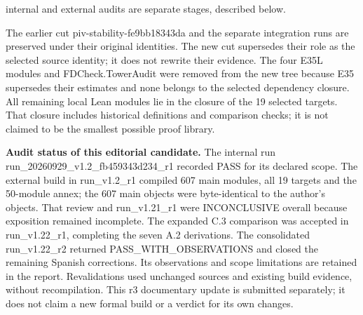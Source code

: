 \documentclass[english,11pt,a4paper]{article}
\newcounter{none}
\begin{document}
internal and external audits are separate stages, described below.

The earlier cut {\ttfamily\small piv-\discretionary{\hbox{\ensuremath{\hookrightarrow}}}{}{}stability-\discretionary{\hbox{\ensuremath{\hookrightarrow}}}{}{}fe9bb18343da} and the separate integration runs are preserved under their original identities. The new cut supersedes their role as the selected source identity; it does not rewrite their evidence. The four E35L modules and {\ttfamily\small FDCheck.\discretionary{\hbox{\ensuremath{\hookrightarrow}}}{}{}TowerAudit} were removed from the new tree because E35 supersedes their estimates and none belongs to the selected dependency closure. All remaining local Lean modules lie in the closure of the 19 selected targets. That closure includes historical definitions and comparison checks; it is not claimed to be the smallest possible proof library.

\textbf{Audit status of this editorial candidate.} The internal run {\ttfamily\small run\_\discretionary{\hbox{\ensuremath{\hookrightarrow}}}{}{}20260929\_\discretionary{\hbox{\ensuremath{\hookrightarrow}}}{}{}v1.\discretionary{\hbox{\ensuremath{\hookrightarrow}}}{}{}2\_\discretionary{\hbox{\ensuremath{\hookrightarrow}}}{}{}fb459343d234\discretionary{\hbox{\ensuremath{\hookrightarrow}}}{}{}\_\discretionary{\hbox{\ensuremath{\hookrightarrow}}}{}{}r1} recorded PASS for its declared scope. The external build in {\ttfamily\small run\_\discretionary{\hbox{\ensuremath{\hookrightarrow}}}{}{}v1.\discretionary{\hbox{\ensuremath{\hookrightarrow}}}{}{}2\_\discretionary{\hbox{\ensuremath{\hookrightarrow}}}{}{}r1} compiled 607 main modules, all 19 targets and the 50-module annex; the 607 main objects were byte-identical to the author's objects. That review and {\ttfamily\small run\_\discretionary{\hbox{\ensuremath{\hookrightarrow}}}{}{}v1.\discretionary{\hbox{\ensuremath{\hookrightarrow}}}{}{}21\_\discretionary{\hbox{\ensuremath{\hookrightarrow}}}{}{}r1} were INCONCLUSIVE overall because exposition remained incomplete. The expanded C.3 comparison was accepted in {\ttfamily\small run\_\discretionary{\hbox{\ensuremath{\hookrightarrow}}}{}{}v1.\discretionary{\hbox{\ensuremath{\hookrightarrow}}}{}{}22\_\discretionary{\hbox{\ensuremath{\hookrightarrow}}}{}{}r1}, completing the seven A.2 derivations. The consolidated {\ttfamily\small run\_\discretionary{\hbox{\ensuremath{\hookrightarrow}}}{}{}v1.\discretionary{\hbox{\ensuremath{\hookrightarrow}}}{}{}22\_\discretionary{\hbox{\ensuremath{\hookrightarrow}}}{}{}r2} returned {\ttfamily\small PASS\_\discretionary{\hbox{\ensuremath{\hookrightarrow}}}{}{}WITH\_\discretionary{\hbox{\ensuremath{\hookrightarrow}}}{}{}OBSERVATIONS} and closed the remaining Spanish corrections. Its observations and scope limitations are retained in the report. Revalidations used unchanged sources and existing build evidence, without recompilation. This r3 documentary update is submitted separately; it does not claim a new formal build or a verdict for its own changes.
\end{document}
